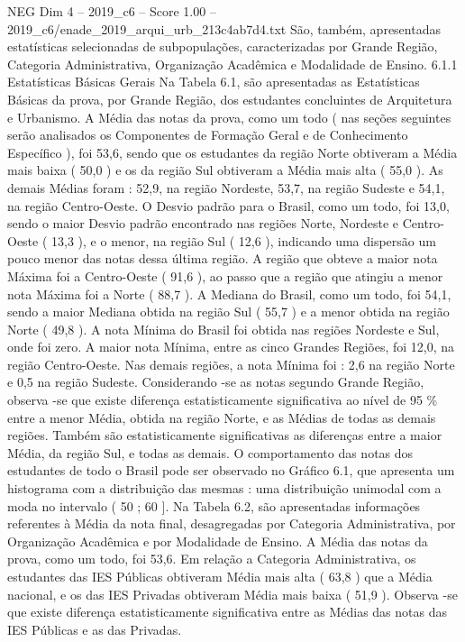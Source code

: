 \begin{textsample}{NEG Dim 4 – 2019\_c6 – Score 1.00 – 2019\_c6/enade\_2019\_arqui\_urb\_213c4ab7d4.txt}
São, também, apresentadas estatísticas selecionadas de subpopulações, caracterizadas por Grande Região, Categoria Administrativa, Organização Acadêmica e Modalidade de Ensino. 6.1.1 Estatísticas Básicas Gerais Na Tabela 6.1, são apresentadas as Estatísticas Básicas da prova, por Grande Região, dos estudantes concluintes de Arquitetura e Urbanismo.
A Média das notas da prova, como um todo ( nas seções seguintes serão analisados os Componentes de Formação Geral e de Conhecimento Específico ), foi 53,6, sendo que os estudantes da região Norte obtiveram a Média mais baixa ( 50,0 ) e os da região Sul obtiveram a Média mais alta ( 55,0 ).
As demais Médias foram : 52,9, na região Nordeste, 53,7, na região Sudeste e 54,1, na região Centro-Oeste.
O Desvio padrão para o Brasil, como um todo, foi 13,0, sendo o maior Desvio padrão encontrado nas regiões Norte, Nordeste e Centro-Oeste ( 13,3 ), e o menor, na região Sul ( 12,6 ), indicando uma dispersão um pouco menor das notas dessa última região.
A região que obteve a maior nota Máxima foi a Centro-Oeste ( 91,6 ), ao passo que a região que atingiu a menor nota Máxima foi a Norte ( 88,7 ).
A Mediana do Brasil, como um todo, foi 54,1, sendo a maior Mediana obtida na região Sul ( 55,7 ) e a menor obtida na região Norte ( 49,8 ).
A nota Mínima do Brasil foi obtida nas regiões Nordeste e Sul, onde foi zero.
A maior nota Mínima, entre as cinco Grandes Regiões, foi 12,0, na região Centro-Oeste.
Nas demais regiões, a nota Mínima foi : 2,6 na região Norte e 0,5 na região Sudeste.
Considerando -se as notas segundo Grande Região, observa -se que existe diferença estatisticamente significativa ao nível de 95 \% entre a menor Média, obtida na região Norte, e as Médias de todas as demais regiões.
Também são estatisticamente significativas as diferenças entre a maior Média, da região Sul, e todas as demais.
O comportamento das notas dos estudantes de todo o Brasil pode ser observado no Gráfico 6.1, que apresenta um histograma com a distribuição das mesmas : uma distribuição unimodal com a moda no intervalo ( 50 ; 60 ].
Na Tabela 6.2, são apresentadas informações referentes à Média da nota final, desagregadas por Categoria Administrativa, por Organização Acadêmica e por Modalidade de Ensino.
A Média das notas da prova, como um todo, foi 53,6.
Em relação a Categoria Administrativa, os estudantes das IES Públicas obtiveram Média mais alta ( 63,8 ) que a Média nacional, e os das IES Privadas obtiveram Média mais baixa ( 51,9 ).
Observa -se que existe diferença estatisticamente significativa entre as Médias das notas das IES Públicas e as das Privadas.

\end{textsample}
